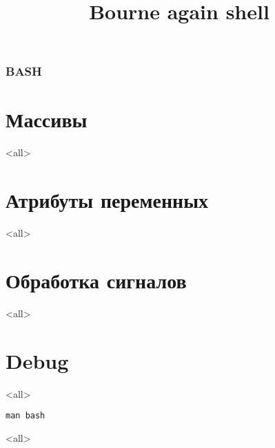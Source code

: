 
\title[bash]{Bourne again shell}




\begin{frame}
	\frametitle{BASH}
	\titlepage
	\vspace{-0.5cm}
	\begin{center}
	\end{center}
\end{frame}

\begin{frame}
	\tableofcontents
	[hideallsubsections]
\end{frame}



\section{Массивы}

\mode<all>{}

\section{Атрибуты переменных}
\mode<all>{}

\section{Обработка сигналов}
\mode<all>{}

\section{Debug}
\mode<all>{}


\begin{frame}{}
\Huge
\begin{center}
	{\tt man bash}
\end{center}
\end{frame}

\mode<all>

